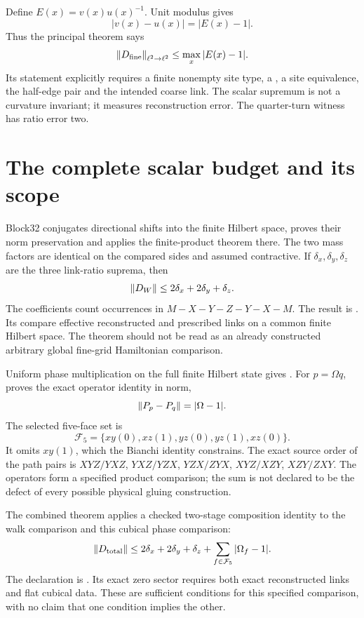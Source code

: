 Define \(E(x)=v(x)u(x)^{-1}\). Unit modulus gives
\[
 |v(x)-u(x)|=|E(x)-1|.
\]
Thus the principal theorem  says
\[
 \left\lVert D_{\mathrm{fine}}\right\rVert_{\ell^2\to\ell^2}
 \le\max_x|E(x)-1|.
\]
Its statement explicitly requires a finite nonempty site type, a , a site equivalence, the half-edge pair and the intended coarse link. The scalar supremum is not a curvature invariant; it measures reconstruction error. The quarter-turn witness has ratio error two.

\section{The complete scalar budget and its scope}

Block32 conjugates directional shifts into the finite Hilbert space, proves their norm preservation and applies the finite-product theorem there. The two mass factors are identical on the compared sides and assumed contractive. If \(\delta_x,\delta_y,\delta_z\) are the three link-ratio suprema, then
\[
 \left\lVert D_W\right\rVert\le2\delta_x+2\delta_y+\delta_z.
\]
The coefficients count occurrences in \(M-X-Y-Z-Y-X-M\). The result is . Its  compare effective reconstructed and prescribed links on a common finite Hilbert space. The theorem should not be read as an already constructed arbitrary global fine-grid Hamiltonian comparison.

Uniform phase multiplication on the full finite Hilbert state gives . For \(p=\Omega q\),  proves the exact operator identity in norm,
\[
 \left\lVert P_p-P_q\right\rVert=|\Omega-1|.
\]
The selected five-face set is
\[
 \mathcal F_5=\{xy(0),xz(1),yz(0),yz(1),xz(0)\}.
\]
It omits \(xy(1)\), which the Bianchi identity constrains. The exact source order of the path pairs is \(XYZ/YXZ\), \(YXZ/YZX\), \(YZX/ZYX\), \(XYZ/XZY\), \(XZY/ZXY\). The operators form a specified product comparison; the sum is not declared to be the defect of every possible physical gluing construction.

The combined theorem applies a checked two-stage composition identity to the walk comparison and this cubical phase comparison:
\[
 \left\lVert D_{\mathrm{total}}\right\rVert
 \le2\delta_x+2\delta_y+\delta_z
      +\sum_{f\in\mathcal F_5}|\Omega_f-1|.
\]
The declaration is . Its exact zero sector requires both exact reconstructed links and flat cubical data. These are sufficient conditions for this specified comparison, with no claim that one condition implies the other.

